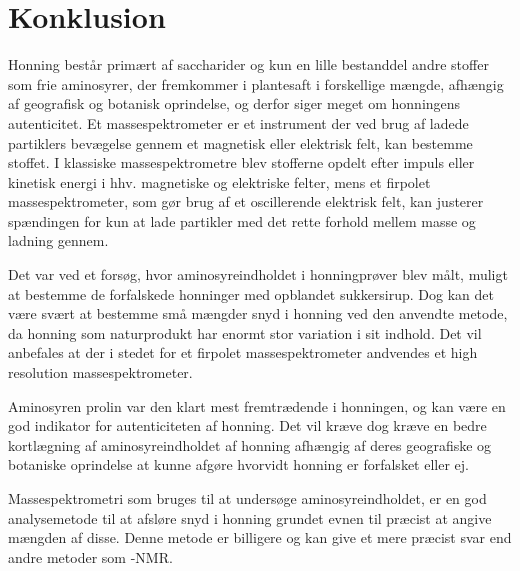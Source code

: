 \chapter{Konklusion}
Honning består primært af saccharider og kun en lille bestanddel andre stoffer som frie aminosyrer,
der fremkommer i plantesaft i forskellige mængde, afhængig af geografisk og botanisk oprindelse, og derfor siger meget om honningens autenticitet.
Et massespektrometer er et instrument der ved brug af ladede partiklers bevægelse gennem et magnetisk eller elektrisk felt, kan bestemme stoffet.
I klassiske massespektrometre blev stofferne opdelt efter impuls eller kinetisk energi i hhv. magnetiske og elektriske felter, mens et firpolet massespektrometer,
som gør brug af et oscillerende elektrisk felt, kan justerer spændingen for kun at lade partikler med det rette forhold mellem masse og ladning gennem.
\par Det var ved et forsøg, hvor aminosyreindholdet i honningprøver blev målt, muligt at bestemme de forfalskede honninger med opblandet sukkersirup.
Dog kan det være svært at bestemme små mængder snyd i honning ved den anvendte metode, da honning som naturprodukt har enormt stor variation i sit indhold.
Det vil anbefales at der i stedet for et firpolet massespektrometer andvendes et high resolution massespektrometer.
\par
Aminosyren prolin var den klart mest fremtrædende i honningen, og kan være en god indikator for autenticiteten af honning.
Det vil kræve dog kræve en bedre kortlægning af aminosyreindholdet af honning afhængig af deres geografiske og botaniske oprindelse at kunne afgøre hvorvidt honning er forfalsket eller ej.
\par Massespektrometri som bruges til at undersøge aminosyreindholdet, er en god analysemetode til at afsløre snyd i honning grundet evnen til præcist at angive mængden af disse.
Denne metode er billigere og kan give et mere præcist svar end andre metoder som -NMR.
